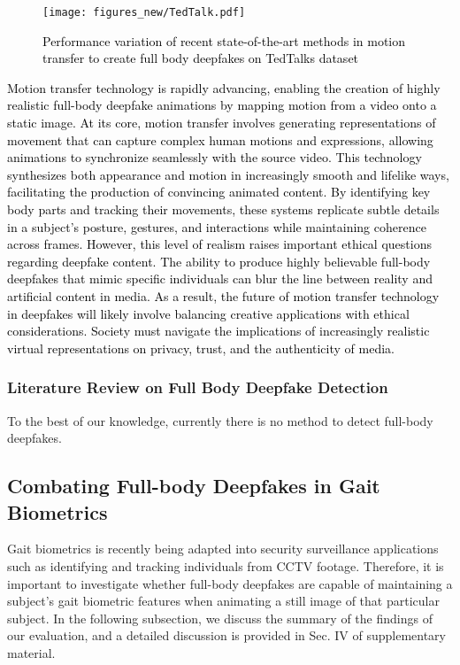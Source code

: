 \begin{figure}
    \centering
    \texttt{[image: figures\_new/TedTalk.pdf]}
    \caption{\textcolor{black}{Performance variation of recent state-of-the-art methods in motion transfer to create full body deepfakes on TedTalks dataset}}
    \label{fig:tedtalks}
\end{figure}


\textcolor{black}{Motion transfer technology is rapidly advancing, enabling the creation of highly realistic full-body deepfake animations by mapping motion from a video onto a static image. At its core, motion transfer involves generating representations of movement that can capture complex human motions and expressions, allowing animations to synchronize seamlessly with the source video. This technology synthesizes both appearance and motion in increasingly smooth and lifelike ways, facilitating the production of convincing animated content. By identifying key body parts and tracking their movements, these systems replicate subtle details in a subject’s posture, gestures, and interactions while maintaining coherence across frames. However, this level of realism raises important ethical questions regarding deepfake content. The ability to produce highly believable full-body deepfakes that mimic specific individuals can blur the line between reality and artificial content in media. As a result, the future of motion transfer technology in deepfakes will likely involve balancing creative applications with ethical considerations. Society must navigate the implications of increasingly realistic virtual representations on privacy, trust, and the authenticity of media.}

\subsubsection{Literature Review on Full Body Deepfake Detection} 

To the best of our knowledge, currently there is no method to detect full-body deepfakes.

\subsection{Combating Full-body Deepfakes in Gait Biometrics}
Gait biometrics is recently being adapted into security surveillance applications such as identifying and tracking individuals from CCTV footage. Therefore, it is important to investigate whether full-body deepfakes are capable of maintaining a subject's gait biometric features when animating a still image of that particular subject. In the following subsection, we discuss the summary of the findings
of our evaluation, and a detailed discussion is provided in Sec.
IV of supplementary material.

